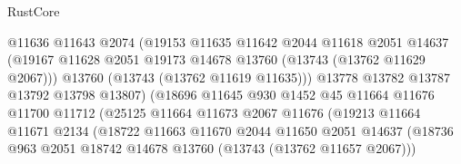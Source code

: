 \begin{lexlean}{RustCore}
\begin{coremodule}
                                    @11636
                                    @11643
                                    @2074
                                    (@19153
                                      @11635
                                      @11642
                                      @2044
                                      @11618
                                      @2051
                                      @14637
                                      (@19167
                                        @11628
                                        @2051
                                        @19173
                                        @14678
                                        @13760
                                        (@13743 (@13762 @11629 @2067)))
                                      @13760
                                      (@13743 (@13762 @11619 @11635)))
                                    @13778
                                    @13782
                                    @13787
                                    @13792
                                    @13798
                                    @13807)
                                  (@18696
                                    @11645
                                    @930
                                    @1452
                                    @45
                                    @11664
                                    @11676
                                    @11700
                                    @11712
                                    (@25125
                                      @11664
                                      @11673
                                      @2067
                                      @11676
                                      (@19213
                                        @11664
                                        @11671
                                        @2134
                                        (@18722
                                          @11663
                                          @11670
                                          @2044
                                          @11650
                                          @2051
                                          @14637
                                          (@18736
                                            @963
                                            @2051
                                            @18742
                                            @14678
                                            @13760
                                            (@13743 (@13762 @11657 @2067)))

\end{coremodule}
\end{lexlean}
